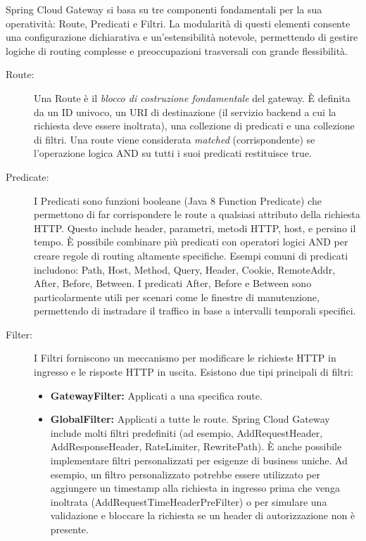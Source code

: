 Spring Cloud Gateway si basa su tre componenti fondamentali per la sua operatività: Route, Predicati e Filtri. La modularità di questi elementi consente una configurazione dichiarativa e un'estensibilità notevole, permettendo di gestire logiche di routing complesse e preoccupazioni trasversali con grande flessibilità.
\begin{description}
    \item[Route:] Una Route è il \textit{blocco di costruzione fondamentale} del gateway. È definita da un ID univoco, un URI di destinazione (il servizio backend a cui la richiesta deve essere inoltrata), una collezione di predicati e una collezione di filtri. Una route viene considerata \textit{matched} (corrispondente) se l'operazione logica AND su tutti i suoi predicati restituisce true.
    
    \item[Predicate:] I Predicati sono funzioni booleane (Java 8 Function Predicate) che permettono di far corrispondere le route a qualsiasi attributo della richiesta HTTP. Questo include header, parametri, metodi HTTP, host, e persino il tempo. È possibile combinare più predicati con operatori logici AND per creare regole di routing altamente specifiche.
    Esempi comuni di predicati includono: Path, Host, Method, Query, Header, Cookie, RemoteAddr, After, Before, Between. I predicati After, Before e Between sono particolarmente utili per scenari come le finestre di manutenzione, permettendo di instradare il traffico in base a intervalli temporali specifici.
    \item[Filter:] I Filtri forniscono un meccanismo per modificare le richieste HTTP in ingresso e le risposte HTTP in uscita. Esistono due tipi principali di filtri:
    \begin{itemize}
        \item \textbf{GatewayFilter:} Applicati a una specifica route.
        \item \textbf{GlobalFilter:} Applicati a tutte le route. Spring Cloud Gateway include molti filtri predefiniti (ad esempio, AddRequestHeader, AddResponseHeader, RateLimiter, RewritePath). È anche possibile implementare filtri personalizzati per esigenze di business uniche. Ad esempio, un filtro personalizzato potrebbe essere utilizzato per aggiungere un timestamp alla richiesta in ingresso prima che venga inoltrata (AddRequestTimeHeaderPreFilter) o per simulare una validazione e bloccare la richiesta se un header di autorizzazione non è presente.
    \end{itemize}
\end{description}

